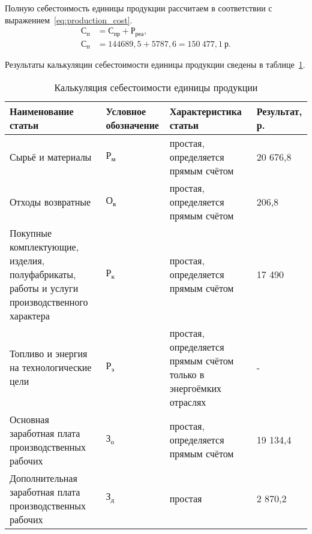 Полную себестоимость единицы продукции рассчитаем в соответствии с
выражением~\ref{eq:production_cost}.
\begin{align}
  \label{eq:production_cost}
  \text{С}_{\text{п}} &= \text{С}_{\text{пр}} + \text{Р}_{\text{реа}}, \\
  \text{С}_{\text{п}} &= 144689{,}5 + 5787{,}6 =
    150~477{,}1 \: \text{р.} \nonumber
\end{align}

\newpage

Результаты калькуляции себестоимости единицы продукции
сведены в таблице~\ref{tbl:results}.
\begin{table}[h!]
  \caption{Калькуляция себестоимости единицы продукции}
  \label{tbl:results}
  \centering
  \small{
    \begin{tabular}{| p{} | p{} |
                      p{} | p{} |}
      \hline

      Наименование статьи & Условное \newline обозначение &
      Характеристика статьи & Результат, р.
      \\ \hline

      Сырьё и материалы & $ \text{Р}_{\text{м}} $ &
      простая, определяется прямым счётом &
      20 676,8 \\ \hline

      Отходы возвратные & $ \text{О}_{\text{в}} $ &
      простая, определяется прямым счётом &
      206,8 \\ \hline

      Покупные комплектующие, изделия, полуфабрикаты, работы и услуги
      производственного характера & $ \text{Р}_{\text{к}} $ &
      простая, определяется прямым счётом &
      17 490 \\ \hline

      Топливо и энергия на технологические цели & $ \text{Р}_{\text{э}} $ &
      простая, определяется прямым счётом только в энергоёмких отраслях &
      - \\ \hline

      Основная заработная плата производственных рабочих & $ \text{З}_{\text{о}} $ &
      простая, определяется прямым счётом &
      19 134,4 \\ \hline

      Дополнительная \newline заработная плата производственных рабочих
      & $ \text{З}_{\text{д}} $ & простая &
      2 870,2 \\ \hline


\end{tabular}}
\end{table}
